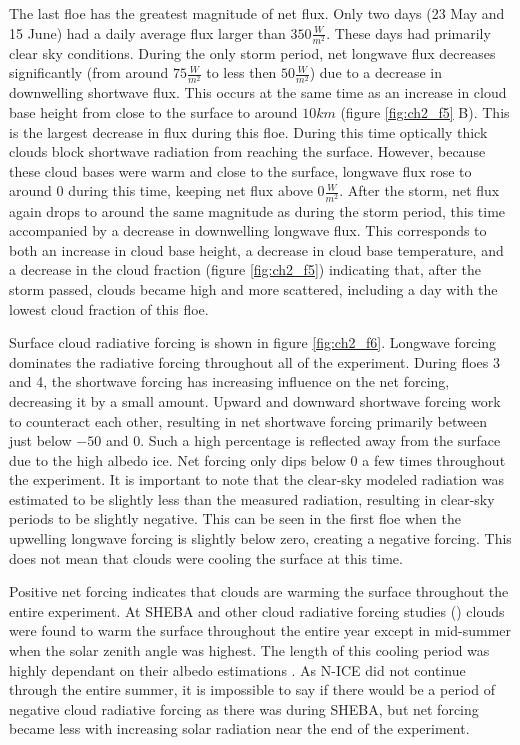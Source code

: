 The last floe has the greatest magnitude of net flux. Only two days (23 May and 15 June) had a daily average flux larger than $350 \frac{W}{m^{2}}$. These days had primarily clear sky conditions. During the only storm period, net longwave flux decreases significantly (from around $75 \frac{W}{m^{2}}$ to less then $50 \frac{W}{m^{2}}$) due to a decrease in downwelling shortwave flux. This occurs at the same time as an increase in cloud base height from close to the surface to around $10 km$ (figure \ref{fig:ch2_f5} B). This is the largest decrease in flux during this floe. During this time optically thick clouds block shortwave radiation from reaching the surface. However, because these cloud bases were warm and close to the surface, longwave flux rose to around $0$ during this time, keeping net flux above $0 \frac{W}{m^{2}}$. After the storm, net flux again drops to around the same magnitude as during the storm period, this time accompanied by a decrease in downwelling longwave flux. This corresponds to both an increase in cloud base height, a decrease in cloud base temperature, and a decrease in the cloud fraction (figure \ref{fig:ch2_f5}) indicating that, after the storm passed, clouds became high and more scattered, including a day with the lowest cloud fraction of this floe. 

Surface cloud radiative forcing is shown in figure \ref{fig:ch2_f6}. Longwave forcing dominates the radiative forcing throughout all of the experiment. During floes 3 and 4, the shortwave forcing has increasing influence on the net forcing, decreasing it by a small amount. Upward and downward shortwave forcing work to counteract each other, resulting in net shortwave forcing primarily between just below $-50$ and $0$. Such a high percentage is reflected away from the surface due to the high albedo ice. Net forcing only dips below $0$ a few times throughout the experiment. It is important to note that the clear-sky modeled radiation was estimated to be slightly less than the measured radiation, resulting in clear-sky periods to be slightly negative. This can be seen in the first floe when the upwelling longwave forcing is slightly below zero, creating a negative forcing. This does not mean that clouds were cooling the surface at this time. 

Positive net forcing indicates that clouds are warming the surface throughout the entire experiment. At SHEBA and other cloud radiative forcing studies (\cite{schweiger:2004, cogley:1984, walsh:1998, curry:1996}) clouds were found to warm the surface throughout the entire year except in mid-summer when the solar zenith angle was highest. The length of this cooling period was highly dependant on their albedo estimations \cite{intrieri:2002}. As N-ICE did not continue through the entire summer, it is impossible to say if there would be a period of negative cloud radiative forcing as there was during SHEBA, but net forcing became less with increasing solar radiation near the end of the experiment.

